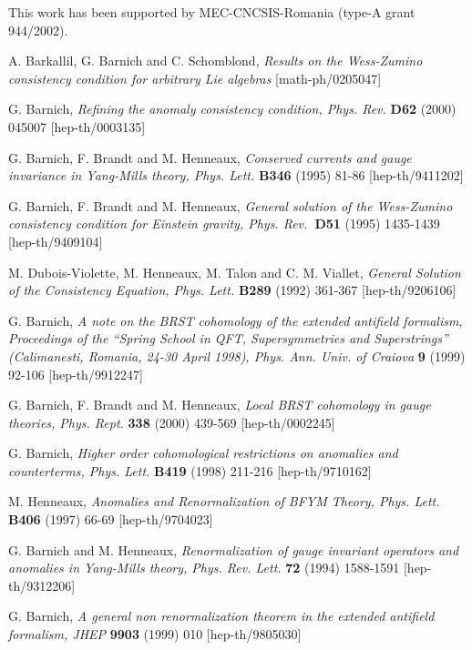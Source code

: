 \documentclass[a4paper,12pt]{article}
\begin{document}
This work has been supported by MEC-CNCSIS-Romania (type-A grant 944/2002).

\begin{thebibliography}{99}
  A. Barkallil, G. Barnich and C. Schomblond, \textit{Results
on the Wess-Zumino consistency condition for arbitrary Lie algebras}
[math-ph/0205047]

  G. Barnich, \textit{Refining the anomaly consistency
condition, Phys. Rev.} \textbf{D62} (2000) 045007 [hep-th/0003135]

  G. Barnich, F. Brandt and M. Henneaux, \textit{Conserved
currents and gauge invariance in Yang-Mills theory, Phys. Lett.} \textbf{B346%
} (1995) 81-86 [hep-th/9411202]

  G. Barnich, F. Brandt and M. Henneaux, \textit{General
solution of the Wess-Zumino consistency condition for Einstein gravity,
Phys. Rev.}\textbf{\ D51} (1995) 1435-1439 [hep-th/9409104]

  M. Dubois-Violette, M. Henneaux, M. Talon and C. M.
Viallet, \textit{General Solution of the Consistency Equation, Phys. Lett.} 
\textbf{B289} (1992) 361-367 [hep-th/9206106]

  G. Barnich, \textit{A note on the BRST cohomology of the
extended antifield formalism, Proceedings of the ``Spring School in QFT,
Supersymmetries and Superstrings'' (Calimanesti, Romania, 24-30 April 1998),
Phys. Ann. Univ. of Craiova} \textbf{9} (1999) 92-106 [hep-th/9912247]

  G. Barnich, F. Brandt and M. Henneaux, \textit{Local BRST
cohomology in gauge theories, Phys. Rept.} \textbf{338} (2000) 439-569
[hep-th/0002245]

  G. Barnich, \textit{Higher order cohomological
restrictions on anomalies and counterterms, Phys. Lett.} \textbf{B419}
(1998) 211-216 [hep-th/9710162]

  M. Henneaux, \textit{Anomalies and Renormalization of BFYM
Theory, Phys. Lett.} \textbf{B406} (1997) 66-69 [hep-th/9704023]

  G. Barnich and M. Henneaux, \textit{Renormalization of
gauge invariant operators and anomalies in Yang-Mills theory, Phys. Rev.
Lett.} \textbf{72} (1994) 1588-1591 [hep-th/9312206]

  G. Barnich, \textit{A general non renormalization theorem
in the extended antifield formalism, JHEP} \textbf{9903} (1999) 010
[hep-th/9805030]


\end{thebibliography}
\end{document}
